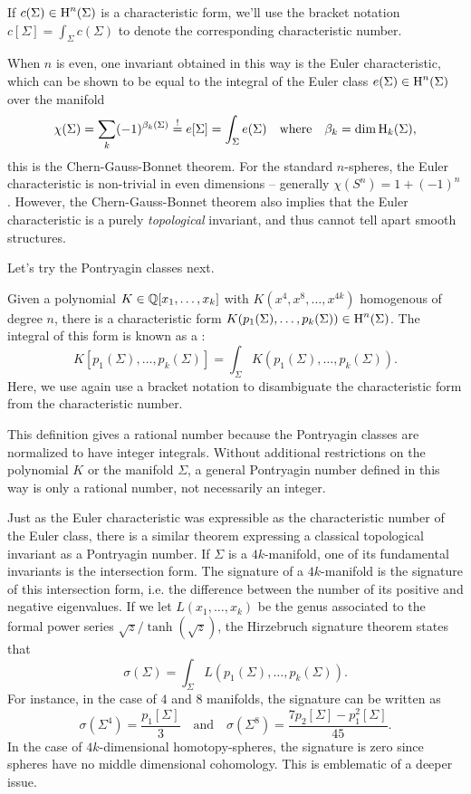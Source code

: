 \begin{convention*}
	If $c(\Sigma)\in \operatorname{H}^n(\Sigma)$ is a characteristic form, we'll use the bracket notation $c[\Sigma]=\int_\Sigma c(\Sigma)$ to denote the corresponding characteristic number.
\end{convention*}

When $n$ is even, one invariant obtained in this way is the Euler characteristic, which can be shown to be equal to the integral of the Euler class $e(\Sigma)\in \operatorname{H}^n(\Sigma)$ over the manifold
\[
	\chi(\Sigma) = \sum_k (-1)^{\beta_k(\Sigma)} \overset{!}{=} e[\Sigma] = \int_\Sigma e(\Sigma)\quad\textrm{where}\quad \beta_k = \dim \operatorname{H}_k(\Sigma),
\]
this is the Chern-Gauss-Bonnet theorem. For the standard $n$-spheres, the Euler characteristic is non-trivial in even dimensions -- generally $\chi(S^n)=1+(-1)^n$. However, the Chern-Gauss-Bonnet theorem also implies that the Euler characteristic is a purely \emph{topological} invariant, and thus cannot tell apart smooth structures.

Let's try the Pontryagin classes next.

\begin{definition}\label{defn:pontryagin_number}
	Given a polynomial $K\in \mathbb{Q}[x_1,\ldots, x_k]$ with $K(x^4, x^8,\ldots, x^{4k})$ homogenous of degree $n$, there is a characteristic form $K(p_1(\Sigma), \ldots, p_k(\Sigma)) \in \operatorname{H}^n(\Sigma)$. The integral of this form is known as a
	:
	\[
		K[p_1(\Sigma), \ldots, p_k(\Sigma)] = \int_{\Sigma} K(p_1(\Sigma), \ldots, p_k(\Sigma)).
	\]
	Here, we use again use a bracket notation to disambiguate the characteristic form from the characteristic number.
\end{definition}

\begin{remark}
	This definition gives a rational number because the Pontryagin classes are normalized to have integer integrals. Without additional restrictions on the polynomial $K$ or the manifold $\Sigma$, a general Pontryagin number defined in this way is only a rational number, not necessarily an integer.
\end{remark}

Just as the Euler characteristic was expressible as the characteristic number of the Euler class, there is a similar theorem expressing a classical topological invariant as a Pontryagin number. If $\Sigma$ is a $4k$-manifold, one of its fundamental invariants is the intersection form. The signature of a $4k$-manifold is the signature of this intersection form, i.e. the difference between the number of its positive and negative eigenvalues. If we let $L(x_1,\ldots, x_k)$ be the genus associated to the formal power series $\sqrt{z}/\tanh(\sqrt{z})$, the Hirzebruch signature theorem states that
\[
	\sigma(\Sigma) = \int_\Sigma L(p_1(\Sigma),\ldots, p_k(\Sigma)).
\]
For instance, in the case of $4$ and $8$ manifolds, the signature can be written as
\[
	\sigma(\Sigma^4) = \frac{p_1[\Sigma]}{3}
	\quad\textrm{and}\quad
	\sigma(\Sigma^8) = \frac{7p_2[\Sigma] - p_1^2[\Sigma]}{45}.
\]
In the case of $4k$-dimensional homotopy-spheres, the signature is zero since spheres have no middle dimensional cohomology. This is emblematic of a deeper issue.

